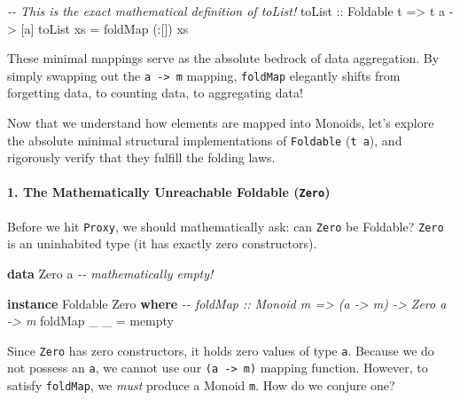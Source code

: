 \documentclass[
]{article}
\newenvironment{Shaded}{}{}
\newcommand{\CommentTok}[1]{\textcolor[rgb]{0.38,0.63,0.69}{\textit{#1}}}
\newcommand{\DataTypeTok}[1]{\textcolor[rgb]{0.56,0.13,0.00}{#1}}
\newcommand{\FunctionTok}[1]{\textcolor[rgb]{0.02,0.16,0.49}{#1}}
\newcommand{\KeywordTok}[1]{\textcolor[rgb]{0.00,0.44,0.13}{\textbf{#1}}}
\newcommand{\NormalTok}[1]{#1}
\newcommand{\OperatorTok}[1]{\textcolor[rgb]{0.40,0.40,0.40}{#1}}
\newcommand{\OtherTok}[1]{\textcolor[rgb]{0.00,0.44,0.13}{#1}}
\begin{document}
\begin{enumerate}
\begin{Shaded}
\begin{Highlighting}[]
\CommentTok{{-}{-} This is the exact mathematical definition of \textasciigrave{}toList\textasciigrave{}!}
\OtherTok{toList\textquotesingle{} ::} \DataTypeTok{Foldable}\NormalTok{ t }\OtherTok{=\textgreater{}}\NormalTok{ t a }\OtherTok{{-}\textgreater{}}\NormalTok{ [a]}
\NormalTok{toList\textquotesingle{} xs }\OtherTok{=} \FunctionTok{foldMap}\NormalTok{ (}\OperatorTok{:}\NormalTok{[]) xs}
\end{Highlighting}
\end{Shaded}
\end{enumerate}

These minimal mappings serve as the absolute bedrock of data
aggregation. By simply swapping out the \texttt{a\ -\textgreater{}\ m}
mapping, \texttt{foldMap} elegantly shifts from forgetting data, to
counting data, to aggregating data!

Now that we understand how elements are mapped into Monoids, let's
explore the absolute minimal structural implementations of
\texttt{Foldable} (\texttt{t\ a}), and rigorously verify that they
fulfill the folding laws.

\paragraph{\texorpdfstring{1. The Mathematically Unreachable Foldable
(\texttt{Zero})}{1. The Mathematically Unreachable Foldable (Zero)}}\label{the-mathematically-unreachable-foldable-zero}

Before we hit \texttt{Proxy}, we should mathematically ask: can
\texttt{Zero} be Foldable? \texttt{Zero} is an uninhabited type (it has
exactly zero constructors).

\begin{Shaded}
\begin{Highlighting}[]
\KeywordTok{data} \DataTypeTok{Zero}\NormalTok{ a }\CommentTok{{-}{-} mathematically empty!}

\KeywordTok{instance} \DataTypeTok{Foldable} \DataTypeTok{Zero} \KeywordTok{where}
    \CommentTok{{-}{-} foldMap :: Monoid m =\textgreater{} (a {-}\textgreater{} m) {-}\textgreater{} Zero a {-}\textgreater{} m}
    \FunctionTok{foldMap}\NormalTok{ \_ \_ }\OtherTok{=} \FunctionTok{mempty}
\end{Highlighting}
\end{Shaded}

Since \texttt{Zero} has zero constructors, it holds zero values of type
\texttt{a}. Because we do not possess an \texttt{a}, we cannot use our
\texttt{(a\ -\textgreater{}\ m)} mapping function. However, to satisfy
\texttt{foldMap}, we \emph{must} produce a Monoid \texttt{m}. How do we
conjure one?
\end{document}
